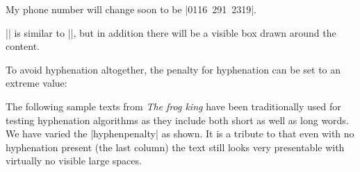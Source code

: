 {{\begin{teX}
My phone number will change soon to be |\mbox{0116 291 2319}|.
\end{teX}

\noindent |\fbox| is similar to |\mbox|, but in addition there will be a visible box drawn around the content.

To avoid hyphenation altogether, the penalty for hyphenation can be set to an extreme value:

\begin{teX}
\end{teX}



The following sample texts from \textit{The frog king}\cite{frogking} have been traditionally used for testing hyphenation algorithms as they
include both short as well as long words. We have varied the |hyphenpenalty| as shown. It is a tribute to \tex that even with no hyphenation present (the last column) the text still looks very presentable with virtually no visible large spaces.

\long{}

\overfullrule=0.1pt

\begin{minipage}{1.9in}
 \sampletext
\end{minipage}\hspace{.8cm}
\begin{minipage}{1.9in}
 \sampletext
\end{minipage}\hspace{.8cm}
\begin{minipage}{1.9in}
  \sampletext
\end{minipage}


\def\samplerivers{%
\hskip1em Repeated repeated repeated repeated
repeated repeated repeated repeated
repeated repeated repeated repeated
repeated repeated repeated repeated
repeated repeated repeated repeated
repeated repeated repeated repeated
repeated repeated repeated repeated
repeated repeated repeated repeated
repeated repeated repeated repeated
repeated repeated repeated repeated
repeated repeated repeated repeated
repeated repeated repeated repeated
repeated.}

}}
